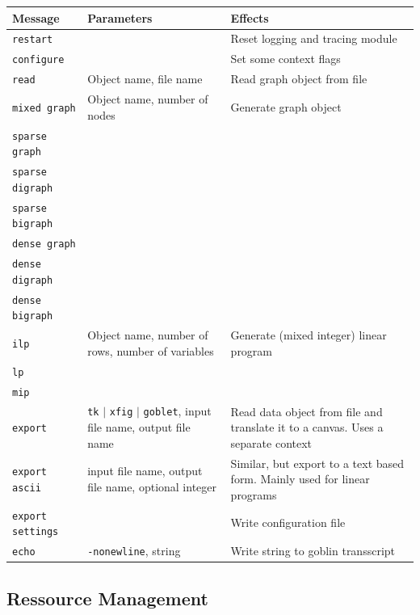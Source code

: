 \documentclass[a4paper,11pt,twoside]{book}
\begin{document}
\bigskip
\begin{center}
\begin{tabular}{|p{3cm}|p{9cm}|p{12.5cm}|}
\hline
{\bf Message}       & {\bf Parameters} & {\bf Effects} \\
\hline
\hline
\verb/restart/      & & Reset logging and tracing module \\
\hline
\verb/configure/    & & Set some context flags \\
\hline
\verb/read/         & Object name, file name & Read graph object from file \\
\hline
\verb/mixed graph/ & Object name, number of nodes & Generate graph object \\
\verb/sparse graph/ &  & \\
\verb/sparse digraph/ & & \\
\verb/sparse bigraph/ & & \\
\verb/dense graph/ & & \\
\verb/dense digraph/ & & \\
\verb/dense bigraph/ & & \\
\hline
\verb/ilp/  & Object name, number of rows, number of variables
            & Generate (mixed integer) linear program \\
\verb/lp/   & & \\
\verb/mip/  & & \\
\hline
\verb/export/ & \verb/tk/ $|$ \verb/xfig/ $|$ \verb/goblet/, input file name,
                output file name
              & Read data object from file and translate it to a canvas.
                Uses a separate context \\
\hline
\verb/export ascii/ & input file name, output file name, optional integer
                    & Similar, but export to a text based form.
                      Mainly used for linear programs \\
\hline
\verb/export settings/ & & Write configuration file \\
\hline
\verb/echo/ & \verb/-nonewline/, string & Write string to goblin transscript \\
\hline
\end{tabular}
\end{center}
\bigskip


\subsection{Ressource Management}
\label{slb_tcl_ressource}
\end{document}
